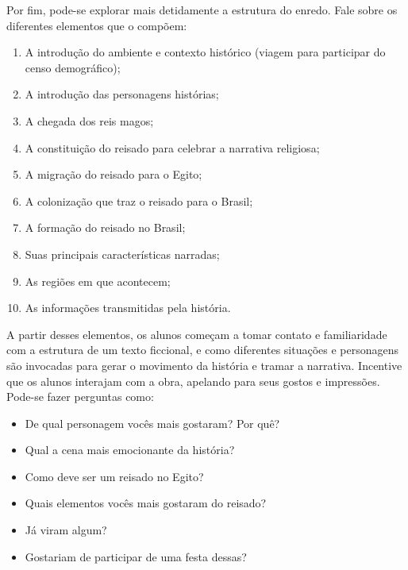\documentclass[11pt]{extarticle}
\begin{document}
Por fim, pode-se explorar mais detidamente a estrutura do enredo. Fale sobre os diferentes elementos que o compõem:

\begin{enumerate}
\item A introdução do ambiente e contexto histórico (viagem para participar do censo demográfico);

\item A introdução das personagens histórias;

\item A chegada dos reis magos;

\item A constituição do reisado para celebrar a narrativa religiosa;

\item A migração do reisado para o Egito;

\item A colonização que traz o reisado para o Brasil;

\item A formação do reisado no Brasil;

\item Suas principais características narradas;

\item As regiões em que acontecem;

\item As informações transmitidas pela história.
\end{enumerate}

A partir desses elementos, os alunos começam a tomar contato e familiaridade com a estrutura de um texto ficcional, e como diferentes situações e personagens são invocadas para gerar o movimento da história e tramar a narrativa. Incentive que os alunos interajam com a obra, apelando para seus gostos e impressões.
Pode-se fazer perguntas como:

\begin{itemize}
\item De qual personagem vocês mais gostaram? Por quê?

\item Qual a cena mais emocionante da história?

\item Como deve ser um reisado no Egito?

\item Quais elementos vocês mais gostaram do reisado?

\item Já viram algum?

\item Gostariam de participar de uma festa dessas?
\end{itemize}
\end{document}
